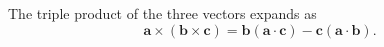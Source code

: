 \documentclass{article}
\begin{document}
The triple product of the three vectors expands as
\begin{equation}
\mathbf{a}\times(\mathbf{b}\times\mathbf{c}) = \mathbf{b}(\mathbf{a}\cdot\mathbf{c}) - \mathbf{c}(\mathbf{a}\cdot\mathbf{b}) .
\label{eq:bac}
\end{equation}
\end{document}
